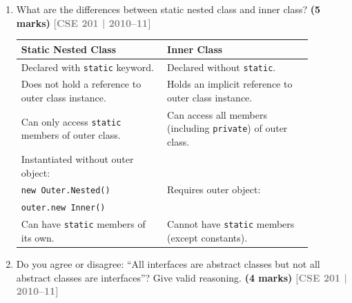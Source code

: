 \documentclass[12pt,a3paper]{article}
\newcommand{\yr}[1]{\hfill\textcolor{gray}{\small\textbf{[#1]}}}
\newcommand{\mk}[1]{\textcolor{orange!70!black}{\small\textbf{(#1 marks)}}}
\begin{document}
\begin{enumerate}
\begin{tcolorbox}
\textit{Note: A method cannot be both \texttt{abstract} and \texttt{final}
--- \texttt{abstract} requires overriding while \texttt{final} prevents it.}

\end{tcolorbox}

\item What are the differences between static nested class and inner class? \mk{5}
\yr{CSE 201 | 2010--11}

\begin{tcolorbox}[enhanced,breakable,ansbox,
  colback=cD!4,colframe=cD,boxrule=0.8pt,arc=5pt,
  title={\textbf{Answer --- Static Nested Class vs.\ Inner Class}},
  fonttitle=\bfseries\color{white},colbacktitle=cD]

\begin{center}
\small
\begin{tabular}{@{}p{0.44\linewidth}p{0.44\linewidth}@{}}
\toprule
\textbf{Static Nested Class} & \textbf{Inner Class} \\
\midrule
Declared with \texttt{static} keyword. &
Declared without \texttt{static}. \\[4pt]
Does not hold a reference to outer class instance. &
Holds an implicit reference to outer class instance. \\[4pt]
Can only access \texttt{static} members of outer class. &
Can access all members (including \texttt{private}) of outer class. \\[4pt]
Instantiated without outer object:\\
\texttt{new Outer.Nested()} &
Requires outer object:\\
\texttt{outer.new Inner()} \\[4pt]
Can have \texttt{static} members of its own. &
Cannot have \texttt{static} members (except constants). \\
\bottomrule
\end{tabular}
\end{center}

\end{tcolorbox}

\item Do you agree or disagree: ``All interfaces are abstract classes but not all abstract classes are interfaces''? Give valid reasoning. \mk{4}
\yr{CSE 201 | 2010--11}

\begin{tcolorbox}[enhanced,breakable,ansbox,
  colback=cD!4,colframe=cD,boxrule=0.8pt,arc=5pt,
  title={\textbf{Answer --- ``All interfaces are abstract classes but not all abstract classes are interfaces''}},
  fonttitle=\bfseries\color{white},colbacktitle=cD]


\end{tcolorbox}
\end{enumerate}
\end{document}
